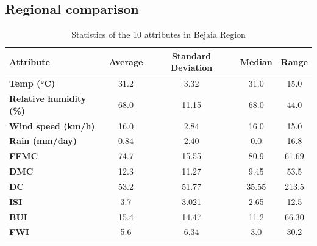 \documentclass[10pt]{article}
\numberwithin{equation}{section}
\numberwithin{figure}{section}
\numberwithin{table}{section}
\begin{document}
\subsection{Regional comparison}
\label{section:data visualisation}
\begin{table}[H]
\centering
\begin{tabular}{|l|c|c|c|c|}
\hline
\textbf{Attribute}              & \textbf{Average} & \textbf{Standard Deviation} &\textbf{Median} &\textbf{Range}   \\ \hline
\textbf{Temp (°C)}              & 31.2                       & 3.32              & 31.0     & 15.0             \\ \hline
\textbf{Relative humidity (\%)} & 68.0                       & 11.15             & 68.0     & 44.0               \\ \hline
\textbf{Wind speed (km/h)}      & 16.0                       & 2.84              & 16.0     & 15.0              \\ \hline
\textbf{Rain (mm/day)}          & 0.84                       & 2.40              & 0.0      &  16.8              \\ \hline
\textbf{FFMC}                   & 74.7                       & 15.55             & 80.9     &  61.69              \\ \hline
\textbf{DMC}                    & 12.3                       & 11.27             & 9.45     & 53.5               \\ \hline
\textbf{DC}                     & 53.2                       & 51.77             & 35.55    & 213.5                \\ \hline
\textbf{ISI}                    & 3.7                        & 3.021             & 2.65     & 12.5               \\ \hline
\textbf{BUI}                    & 15.4                       & 14.47             & 11.2     & 66.30               \\ \hline
\textbf{FWI}                    & 5.6                        & 6.34              & 3.0      & 30.2             \\ \hline
\end{tabular}
\caption{Statistics of the 10 attributes in Bejaia Region}
\label{table:statistics_bejaia}
\end{table}
\end{document}
